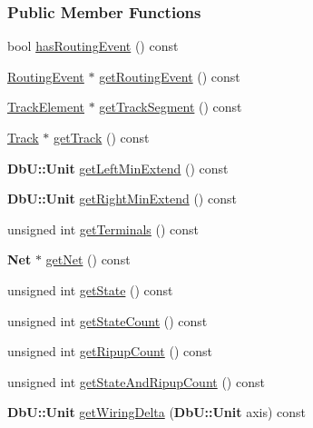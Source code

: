 \subsubsection*{Public Member Functions}
\begin{DoxyCompactItemize}
\item 
bool \hyperlink{classKite_1_1DataNegociate_a8edc902c3b61bd17205ba0ccc3f2b4dd}{has\-Routing\-Event} () const 
\item 
\hyperlink{classKite_1_1RoutingEvent}{Routing\-Event} $\ast$ \hyperlink{classKite_1_1DataNegociate_ad57c5675c842f63193258cb1faad5fc7}{get\-Routing\-Event} () const 
\item 
\hyperlink{classKite_1_1TrackElement}{Track\-Element} $\ast$ \hyperlink{classKite_1_1DataNegociate_a76bd0dbdb86c231cbdc92b1e2b8311dd}{get\-Track\-Segment} () const 
\item 
\hyperlink{classKite_1_1Track}{Track} $\ast$ \hyperlink{classKite_1_1DataNegociate_abfd8de286baf41eea066220773c7046d}{get\-Track} () const 
\item 
{\bf Db\-U\-::\-Unit} \hyperlink{classKite_1_1DataNegociate_ad8c1073ad0806f86b183c2e5f7badd3e}{get\-Left\-Min\-Extend} () const 
\item 
{\bf Db\-U\-::\-Unit} \hyperlink{classKite_1_1DataNegociate_ad9d0adcb0ddfcd718445ceca8fabc2f0}{get\-Right\-Min\-Extend} () const 
\item 
unsigned int \hyperlink{classKite_1_1DataNegociate_abaca79d35201f3fb74ebb8f3efdfa44f}{get\-Terminals} () const 
\item 
{\bf Net} $\ast$ \hyperlink{classKite_1_1DataNegociate_adf3e1a980233163de0ca34a5c3575998}{get\-Net} () const 
\item 
unsigned int \hyperlink{classKite_1_1DataNegociate_aeff84fdf6cc443a2c7a7bd33b03e871f}{get\-State} () const 
\item 
unsigned int \hyperlink{classKite_1_1DataNegociate_a4a065b203d4b52646032d4f1009bf3dd}{get\-State\-Count} () const 
\item 
unsigned int \hyperlink{classKite_1_1DataNegociate_acdcfa27d2dbd2c8147daac729a420354}{get\-Ripup\-Count} () const 
\item 
unsigned int \hyperlink{classKite_1_1DataNegociate_a9ffd1b2af7972f7be264cb778fba69cf}{get\-State\-And\-Ripup\-Count} () const 
\item 
{\bf Db\-U\-::\-Unit} \hyperlink{classKite_1_1DataNegociate_aafdec9bb61759e2ff1bfd03a05597f2e}{get\-Wiring\-Delta} ({\bf Db\-U\-::\-Unit} axis) const 
\item 

\end{DoxyCompactItemize}
